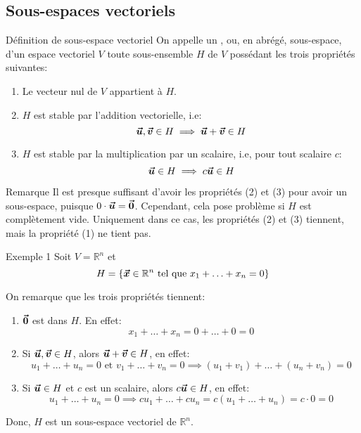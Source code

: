 \documentclass[a4paper]{article}
\begin{document}
\subsection{Sous-espaces vectoriels}
\begin{parag}{Définition de sous-espace vectoriel}
    On appelle un , ou, en abrégé, sous-espace, d'un espace vectoriel $V$ toute sous-ensemble $H$ de $V$ possédant les trois propriétés suivantes:
    \begin{enumerate}
        \item Le vecteur nul de $V$ appartient à $H$.
        \item $H$ est stable par l'addition vectorielle, i.e:
        \[\bm{\protect\vec{u}}, \bm{\protect\vec{v}} \in H \implies \bm{\protect\vec{u}} + \bm{\protect\vec{v}} \in H\]
        \item $H$ est stable par la multiplication par un scalaire, i.e, pour tout scalaire $c$:
        \[\bm{\protect\vec{u}} \in H \implies c \bm{\protect\vec{u}} \in H\]

    \end{enumerate}

    \begin{subparag}{Remarque}
        Il est presque suffisant d'avoir les propriétés (2) et (3) pour avoir un sous-espace, puisque $0\cdot \bm{\protect\vec{u}} = \bm{\protect\vec{0}}$. Cependant, cela pose problème si $H$ est complètement vide. Uniquement dans ce cas, les propriétés (2) et (3) tiennent, mais la propriété (1) ne tient pas.
    \end{subparag}

\end{parag}

\begin{parag}{Exemple 1}
    Soit $V = \mathbb{R}^{n}$ et
    \[H = \left\{\bvec{x} \in \mathbb{R}^{n} \telque x_1 + \ldots + x_n = 0\right\}\]

    On remarque que les trois propriétés tiennent:
    \begin{enumerate}
        \item $\bm{\protect\vec{0}}$ est dans $H$. En effet: \[x_1 + \ldots + x_n = 0 + \ldots + 0 = 0\]
        \item Si $\bm{\protect\vec{u}}, \bm{\protect\vec{v}} \in H$, alors $\bm{\protect\vec{u}} + \bm{\protect\vec{v}} \in H$, en effet:
        \[u_1 + \ldots + u_n = 0 \text{ et } v_1 + \ldots + v_n = 0 \implies \left(u_1 + v_1\right) + \ldots + \left(u_n + v_n\right) = 0\]
        \item Si $\bm{\protect\vec{u}} \in H$ et $c$ est un scalaire, alors $c \bm{\protect\vec{u}} \in H$, en effet:
        \[u_1 + \ldots + u_n = 0 \implies c u_1 + \ldots + c u_n = c\left(u_1 + \ldots + u_n\right) = c\cdot0 = 0\]
    \end{enumerate}

    Donc, $H$ est un sous-espace vectoriel de $\mathbb{R}^{n}$.

\end{parag}
\end{document}
